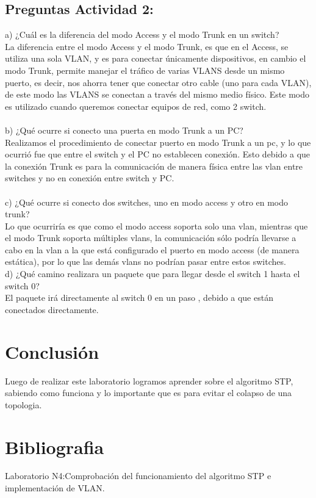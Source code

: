 \documentclass{article}
\begin{document}
\subsection{Preguntas Actividad 2:}
a) ¿Cuál es la diferencia del modo Access y el modo Trunk en un switch?\\
La diferencia entre el modo Access y el modo Trunk, es que en el Access, se utiliza una sola VLAN, y es para conectar únicamente dispositivos, en cambio el modo Trunk, permite manejar el tráfico de varias VLANS desde un mismo puerto, es decir, nos ahorra tener que conectar otro cable (uno para cada VLAN), de este modo las VLANS se conectan a través del mismo medio físico. Este modo es utilizado cuando queremos conectar equipos de red, como 2 switch.\\\\
b) ¿Qué ocurre si conecto una puerta en modo Trunk a un PC?\\
Realizamos el procedimiento de conectar puerto en modo Trunk a un pc, y lo que ocurrió fue que entre el switch y el PC no establecen conexión. Esto debido a que la conexión Trunk es para la comunicación de manera física entre las vlan entre switches y no en conexión entre switch y PC.\\\\
c) ¿Qué ocurre si conecto dos switches, uno en modo access y otro en modo trunk?\\
 Lo que ocurriría es que como el modo access soporta solo una vlan, mientras que el modo Trunk soporta múltiples vlans, la comunicación sólo podría llevarse a cabo en la vlan a la que está configurado el puerto en modo access (de manera estática), por lo que las demás vlans no podrían pasar entre estos switches.\\
d) ¿Qué camino realizara un paquete que para llegar desde el switch 1 hasta el switch 0?\\
El paquete irá directamente al switch 0 en un paso , debido a que están conectados directamente. \\

\section{Conclusión}
Luego de realizar este laboratorio logramos aprender sobre el algoritmo STP, sabiendo como funciona y lo importante que es para evitar el colapso de una topologia.\\


\section{Bibliografia}
Laboratorio N4:Comprobación del funcionamiento del algoritmo STP e implementación de VLAN.\\
\end{document}
